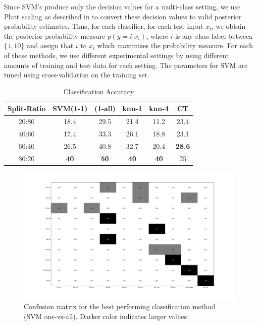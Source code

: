 \documentclass[10pt,twocolumn,letterpaper]{article}
\begin{document}
Since SVM's produce only the decision values for a multi-class setting, we use Platt scaling as described in \cite{Platt1999} to convert these decision values to valid posterior probability estimates. Thus, for each classifier, for each test input $x_t$, we obtain the posterior probability measure $p(y=i|x_t)$, where $i$ is any class label between $\{1,10\}$ and assign that $i$  to $x_t$ which maximizes the probability measure. 
For each of these methods, we use different experimental settings by using different amounts of training and test data for each setting. The parameters for SVM are tuned using cross-validation  on the training set. 

\begin{table}[ht] 
\caption{Classification Accuracy} %
\centering %
\begin{tabular}{c c c c c c} %
\hline\hline %
Split-Ratio  & SVM(1-1) & (1-all) & knn-1 & knn-4 & CT\\ [0.5ex] %
\hline %
20:80 &	18.4	 & 29.5  & 21.4 & 11.2 & 23.4 \\
40:60 &	17.4 &	33.3 & 26.1	& 18.8 &	 23.1 \\
60:40 &	26.5	 & 40.8	 & 32.7	& 20.4 &	 \textbf{28.6} \\
80:20 &	\textbf{40}   &	\textbf{50}	 & \textbf{40}	& \textbf{40}	   & 25 \\  [1ex]
\hline %
\end{tabular} 
\label{table:acc} %
\end{table} 

\begin{figure}[ht]
\includegraphics[scale=0.18]{conf_svm_ovr.png}
\caption{Confusion matrix for the best performing classification method (SVM one-vs-all). Darker color indicates larger values}
\label{Fig:conf_mat}
\end{figure}
\end{document}
